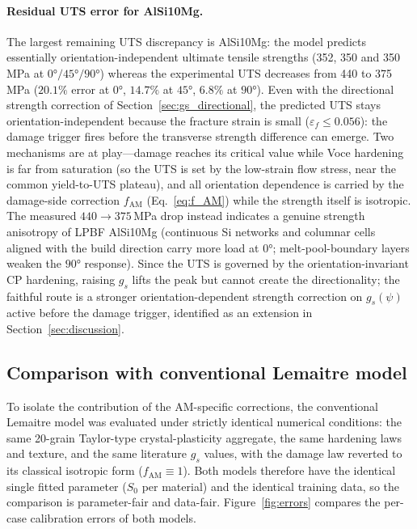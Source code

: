 \paragraph{Residual UTS error for AlSi10Mg.} The largest remaining UTS discrepancy is AlSi10Mg: the model predicts essentially orientation-independent ultimate tensile strengths (352, 350 and 350\,MPa at $\ang{0}/\ang{45}/\ang{90}$) whereas the experimental UTS decreases from 440 to 375\,MPa ($20.1\%$ error at $\ang{0}$, $14.7\%$ at $\ang{45}$, $6.8\%$ at $\ang{90}$). Even with the directional strength correction of Section~\ref{sec:gs_directional}, the predicted UTS stays orientation-independent because the fracture strain is small ($\varepsilon_f \le 0.056$): the damage trigger fires before the transverse strength difference can emerge. Two mechanisms are at play---damage reaches its critical value while Voce hardening is far from saturation (so the UTS is set by the low-strain flow stress, near the common yield-to-UTS plateau), and all orientation dependence is carried by the damage-side correction $f_{\mathrm{AM}}$ (Eq.~\eqref{eq:f_AM}) while the strength itself is isotropic. The measured $440\to375$\,MPa drop instead indicates a genuine strength anisotropy of LPBF AlSi10Mg (continuous Si networks and columnar cells aligned with the build direction carry more load at $\ang{0}$; melt-pool-boundary layers weaken the $\ang{90}$ response). Since the UTS is governed by the orientation-invariant CP hardening, raising $g_s$ lifts the peak but cannot create the directionality; the faithful route is a stronger orientation-dependent strength correction on $g_s(\psi)$ active before the damage trigger, identified as an extension in Section~\ref{sec:discussion}.

\subsection{Comparison with conventional Lemaitre model}

To isolate the contribution of the AM-specific corrections, the conventional Lemaitre model was evaluated under strictly identical numerical conditions: the same 20-grain Taylor-type crystal-plasticity aggregate, the same hardening laws and texture, and the same literature $g_s$ values, with the damage law reverted to its classical isotropic form ($f_{\mathrm{AM}} \equiv 1$). Both models therefore have the identical single fitted parameter ($S_0$ per material) and the identical training data, so the comparison is parameter-fair and data-fair. Figure~\ref{fig:errors} compares the per-case calibration errors of both models.

